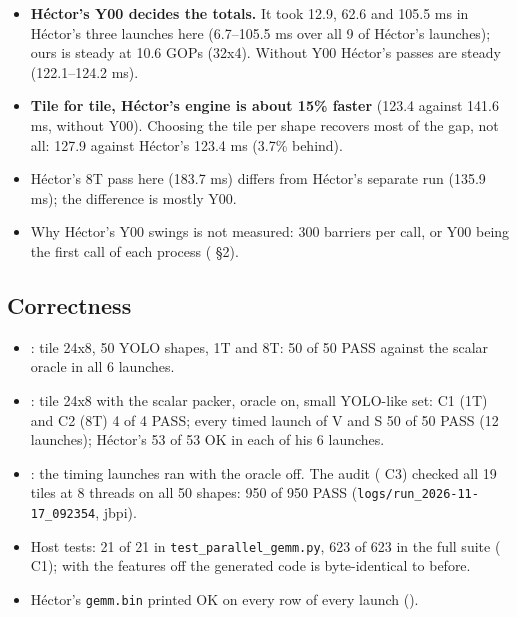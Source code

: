 \begin{itemize}\setlength\itemsep{1pt}
\item \textbf{H\'ector's Y00 decides the totals.} It took 12.9, 62.6 and 105.5 ms in H\'ector's three launches here (6.7--105.5 ms over all 9 of H\'ector's launches); ours is steady at 10.6 GOPs (32x4). Without Y00 H\'ector's passes are steady (122.1--124.2 ms).
\item \textbf{Tile for tile, H\'ector's engine is about 15\% faster} (123.4 against 141.6 ms, without Y00). Choosing the tile per shape recovers most of the gap, not all: 127.9 against H\'ector's 123.4 ms (3.7\% behind).
\item H\'ector's 8T pass here (183.7 ms) differs from H\'ector's separate  run (135.9 ms); the difference is mostly Y00.
\item Why H\'ector's Y00 swings is not measured: 300 barriers per call, or Y00 being the first call of each process ( \S2).
\end{itemize}

\subsection{Correctness}
\begin{itemize}\setlength\itemsep{1pt}
\item {}: tile 24x8, 50 YOLO shapes, 1T and 8T: 50 of 50 PASS against the scalar oracle in all 6 launches.
\item {}: tile 24x8 with the scalar packer, oracle on, small YOLO-like set: C1 (1T) and C2 (8T) 4 of 4 PASS; every timed launch of V and S 50 of 50 PASS (12 launches); H\'ector's 53 of 53 OK in each of his 6 launches.
\item {}: the timing launches ran with the oracle off. The audit ( C3) checked all 19 tiles at 8 threads on all 50 shapes: 950 of 950 PASS (\texttt{logs/run\_2026-11-17\_092354}, jbpi).
\item Host tests: 21 of 21 in \texttt{test\_parallel\_gemm.py}, 623 of 623 in the full suite ( C1); with the features off the generated code is byte-identical to before.
\item H\'ector's \texttt{gemm.bin} printed OK on every row of every launch ().
\end{itemize}
